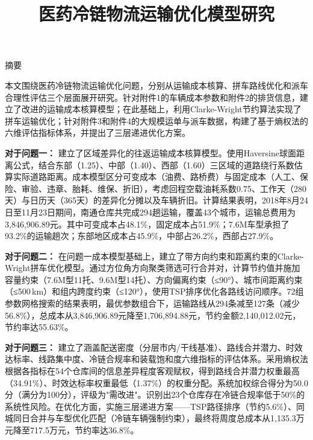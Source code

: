 \documentclass[12pt,fontset=fandol]{ctexart}
\title{医药冷链物流运输优化模型研究}
\begin{document}
	\maketitle

\vspace{1em}

\begin{center}
{\heiti 摘\quad 要}
\end{center}

\vspace{0.5em}

本文围绕医药冷链物流运输优化问题，分别从运输成本核算、拼车路线优化和派车合理性评估三个层面展开研究。针对附件1的车辆成本参数和附件2的排货信息，建立了改进的运输成本核算模型；在此基础上，利用Clarke-Wright节约算法实现了拼车运输优化；针对附件3和附件4的大规模运单与派车数据，构建了基于熵权法的六维评估指标体系，并提出了三层递进优化方案。

{\bf 对于问题一：} 建立了区域差异化的往返运输成本核算模型。使用Haversine球面距离公式，结合东部（1.25）、中部（1.40）、西部（1.60）三区域的道路绕行系数估算实际道路距离。成本模型区分可变成本（油费、路桥费）与固定成本（人工、保险、审验、违章、胎耗、维保、折旧），考虑回程空载油耗系数0.75、工作天（280天）与日历天（365天）的差异化分摊以及车辆折旧。计算结果表明，2018年8月24日至11月23日期间，南通仓库共完成294趟运输，覆盖43个城市，运输总费用为3,846,906.89元。其中可变成本占48.1\%，固定成本占51.9\%；7.6M车型承担了93.2\%的运输趟次；东部地区成本占45.9\%，中部占26.2\%，西部占27.9\%。

{\bf 对于问题二：} 在问题一成本模型基础上，建立了带方向约束和距离约束的Clarke-Wright拼车优化模型。通过方位角方向聚类筛选可行合并对，计算节约值并施加容量约束（7.6M型11托、9.6M型14托）、方向偏离约束（≤90°）、城市间距离约束（≤500\,km）和组内跨度约束（≤120°），使用TSP排序优化各路线访问顺序。72组参数网格搜索的结果表明，最优参数组合下，运输路线从294条减至127条（减少56.8\%），总成本从3,846,906.89元降至1,706,894.88元，节约金额2,140,012.02元，节约率达55.63\%。

{\bf 对于问题三：} 建立了涵盖配送密度（分层市内/干线基准）、路线合并潜力、时效达标率、线路集中度、冷链合规率和装载饱和度六维指标的评估体系。采用熵权法根据各指标在54个仓库间的信息差异程度客观赋权，得到路线合并潜力权重最高（34.91\%）、时效达标率权重最低（1.37\%）的权重分配。系统加权综合得分为50.0分（满分为100分），评级为"需改进"。识别出23个仓库存在冷链合规率低于50\%的系统性风险。在优化方面，实施三层递进方案——TSP路径排序（节约5.6\%）、同城同日合并与车型优化匹配（冷链车辆强制约束），最终将周度总成本从1,135.3万元降至717.5万元，节约率达36.8\%。
\end{document}
